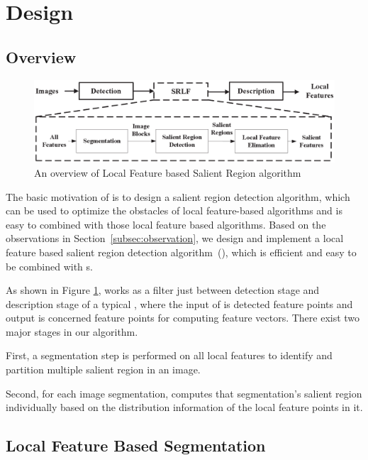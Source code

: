 \section{{\sys} Design}
\label{sec:algorithm}

\subsection{Overview}
\label{sec:algorithm_overview}

\begin{figure}[!t]
\centering
\includegraphics[width=5.0in]{images/fig-overview.eps}
\caption{An overview of Local Feature based Salient Region algorithm}
\label{fig:overview}
\end{figure}

The basic motivation of {\sys} is to design a salient region detection algorithm, which can be used to optimize the obstacles of local feature-based algorithms and is easy to combined with those local feature based algorithms. Based on the observations in Section~\ref{subsec:observation}, we design and implement a local feature based salient region detection algorithm~({\sys}), which is efficient and easy to be combined with {\lfea}s.    

As shown in Figure \ref{fig:overview}, {\sys} works as a filter just between detection stage and description stage of a typical {\lfea}, where the input of {\sys} is detected feature points and output is concerned feature points for computing feature vectors. There exist two major stages in our algorithm.
\begin{inparaenum}
\item First, a segmentation step is performed on all local features to identify and partition multiple salient region in an image. 
\item Second, for each image segmentation, {\sys} computes that segmentation's salient region individually based on the distribution information of the local feature points in it.
\end{inparaenum}

\subsection{Local Feature Based Segmentation}
\label{sec:algorithm_segmentation}


